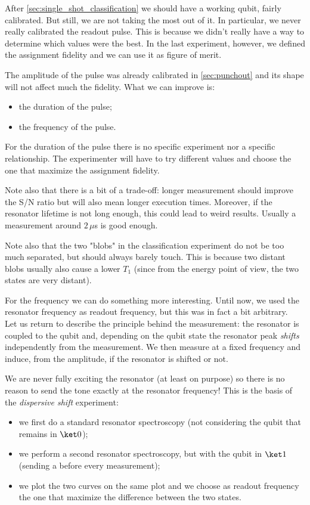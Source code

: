 
After \cref{sec:single_shot_classification} we should have a working qubit, fairly calibrated.
But still, we are not taking the most out of it.
In particular, we never really calibrated the readout pulse.
This is because we didn't really have a way to determine which values were the best.
In the last experiment, however, we defined the assignment fidelity and we can use it as figure of merit.

The amplitude of the pulse was already calibrated in \cref{sec:punchout} and its shape will not affect much the fidelity. What we can improve is:
\begin{itemize}
    \item the duration of the pulse;
    \item the frequency of the pulse.
\end{itemize}

For the duration of the pulse there is no specific experiment nor a specific relationship.
The experimenter will have to try different values and choose the one that maximize the assignment fidelity. 

Note also that there is a bit of a trade-off: longer measurement should improve the S/N ratio but will also mean longer execution times. Moreover, if the resonator lifetime is not long enough, this could lead to weird results.
Usually a measurement around $2\,\mu$s is good enough.

Note also that the two "blobs" in the classification experiment do not be too much separated, but should always barely touch. This is because two distant blobs usually also cause a lower $T_1$ (since from the energy point of view, the two states are very distant). 

For the frequency we can do something more interesting.
Until now, we used the resonator frequency as readout frequency, but this was in fact a bit arbitrary.\\
Let us return to describe the principle behind the measurement: the resonator is coupled to the qubit and, depending on the qubit state the resonator peak \textit{shifts} independently from the measurement.
We then measure at a fixed frequency and induce, from the amplitude, if the resonator is shifted or not.

We are never fully exciting the resonator (at least on purpose) so there is no reason to send the tone exactly at the resonator frequency!
This is the basis of the \textit{dispersive shift} experiment:
\begin{itemize}
    \item we first do a  standard resonator spectroscopy (not considering the qubit that remains in $\ket 0$);
    \item we perform a second resonator spectroscopy, but with the qubit in $\ket 1$ (sending a \pipulse before every measurement);
    \item we plot the two curves on the same plot and we choose as readout frequency the one that maximize the difference between the two states.
\end{itemize}

